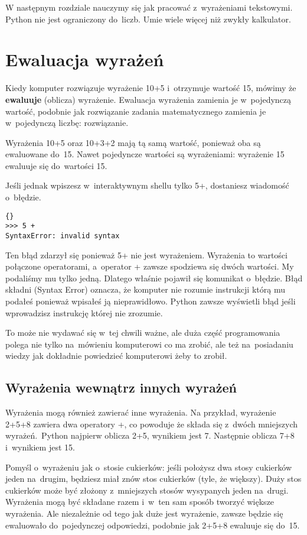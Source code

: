 \documentclass{book}
\begin{document}
W następnym rozdziale nauczymy się jak pracować z~wyrażeniami tekstowymi. Python nie jest ograniczony do~liczb. Umie wiele więcej niż zwykły kalkulator.

\section{Ewaluacja wyrażeń}

Kiedy komputer rozwiązuje wyrażenie 10+5 i~otrzymuje wartość 15, mówimy że {\bf ewaluuje} (oblicza) wyrażenie. Ewaluacja wyrażenia zamienia je w~pojedynczą wartość, podobnie jak rozwiązanie zadania matematycznego zamienia je w~pojedynczą liczbę: rozwiązanie.

Wyrażenia 10+5 oraz 10+3+2 mają tą samą wartość, ponieważ oba są ewaluowane do~15. Nawet pojedyncze wartości są wyrażeniami: wyrażenie 15 ewaluuje się do~wartości 15.

Jeśli jednak wpiszesz w~interaktywnym shellu tylko 5+, dostaniesz wiadomość o~błędzie.
\lstset{language=python}
\begin{lstlisting}{}
>>> 5 +
SyntaxError: invalid syntax
\end{lstlisting}

Ten błąd zdarzył się ponieważ 5+ nie jest wyrażeniem. Wyrażenia to wartości połączone operatorami, a~operator + zawsze spodziewa się dwóch wartości. My podaliśmy mu tylko jedną. Dlatego właśnie pojawił się komunikat o~błędzie. Błąd składni (Syntax Error) oznacza, że komputer nie rozumie instrukcji którą mu podałeś ponieważ wpisałeś ją nieprawidłowo. Python zawsze wyświetli błąd jeśli wprowadzisz instrukcję której nie zrozumie.

To może nie wydawać się w~tej chwili ważne, ale duża część programowania polega nie tylko na~mówieniu komputerowi co ma zrobić, ale też na~posiadaniu wiedzy jak dokładnie powiedzieć komputerowi żeby to zrobił.

\subsection{Wyrażenia wewnątrz innych wyrażeń}

Wyrażenia mogą również zawierać inne wyrażenia. Na przykład, wyrażenie 2+5+8 zawiera dwa operatory +, co powoduje że składa się z~dwóch mniejszych wyrażeń.~Python najpierw oblicza 2+5, wynikiem jest 7. Następnie oblicza 7+8 i~wynikiem jest 15.

Pomyśl o~wyrażeniu jak o~stosie cukierków: jeśli położysz dwa stosy cukierków jeden na~drugim, będziesz miał znów stos cukierków (tyle, że większy). Duży stos cukierków może być złożony z~mniejszych stosów wysypanych jeden na~drugi. Wyrażenia mogą być składane razem i~w~ten sam sposób tworzyć większe wyrażenia. Ale niezależnie od tego jak duże jest wyrażenie, zawsze będzie się ewaluowało do~pojedynczej odpowiedzi, podobnie jak 2+5+8 ewaluuje się do~15.
\end{document}
